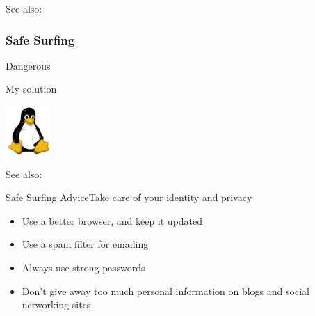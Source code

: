 See also: 

\subsubsection{Safe Surfing}

\begin{frame}{Dangerous}
  \begin{center}
  \end{center}\pause
  \begin{iblock}{My solution}
    \begin{center}
      \includegraphics[height=5em]{linuxlogo}
    \end{center}
  \end{iblock}
\end{frame}

See also: 
  

\begin{frame}{Safe Surfing Advice}{Take care of your identity and privacy}
  \begin{itemize}
  \item Use a better browser, and keep it updated
  \item Use a spam filter for emailing
  \item Always use strong passwords
  \item Don't give away too much personal information on blogs and social networking sites
  \end{itemize}
\end{frame}

